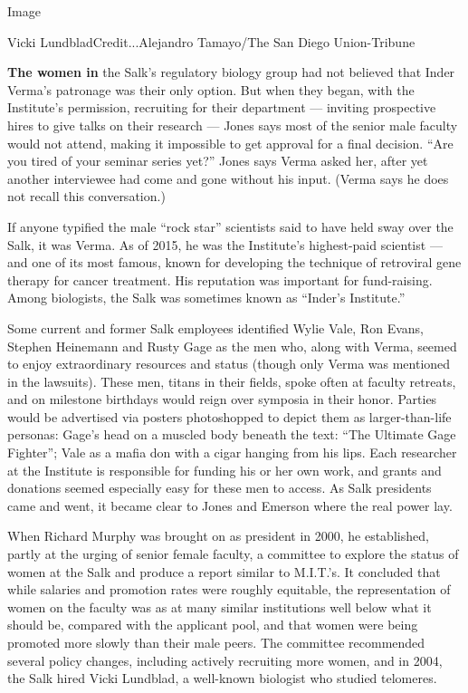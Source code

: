 Image

Vicki LundbladCredit...Alejandro Tamayo/The San Diego Union-Tribune

\textbf{The women in} the Salk's regulatory biology group had not
believed that Inder Verma's patronage was their only option. But when
they began, with the Institute's permission, recruiting for their
department --- inviting prospective hires to give talks on their
research --- Jones says most of the senior male faculty would not
attend, making it impossible to get approval for a final decision. ``Are
you tired of your seminar series yet?'' Jones says Verma asked her,
after yet another interviewee had come and gone without his input.
(Verma says he does not recall this conversation.)

If anyone typified the male ``rock star'' scientists said to have held
sway over the Salk, it was Verma. As of 2015, he was the Institute's
highest-paid scientist --- and one of its most famous, known for
developing the technique of retroviral gene therapy for cancer
treatment. His reputation was important for fund-raising. Among
biologists, the Salk was sometimes known as ``Inder's Institute.''

Some current and former Salk employees identified Wylie Vale, Ron Evans,
Stephen Heinemann and Rusty Gage as the men who, along with Verma,
seemed to enjoy extraordinary resources and status (though only Verma
was mentioned in the lawsuits). These men, titans in their fields, spoke
often at faculty retreats, and on milestone birthdays would reign over
symposia in their honor. Parties would be advertised via posters
photoshopped to depict them as larger-than-life personas: Gage's head on
a muscled body beneath the text: ``The Ultimate Gage Fighter''; Vale as
a mafia don with a cigar hanging from his lips. Each researcher at the
Institute is responsible for funding his or her own work, and grants and
donations seemed especially easy for these men to access. As Salk
presidents came and went, it became clear to Jones and Emerson where the
real power lay.

When Richard Murphy was brought on as president in 2000, he established,
partly at the urging of senior female faculty, a committee to explore
the status of women at the Salk and produce a report similar to
M.I.T.'s. It concluded that while salaries and promotion rates were
roughly equitable, the representation of women on the faculty was as at
many similar institutions well below what it should be, compared with
the applicant pool, and that women were being promoted more slowly than
their male peers. The committee recommended several policy changes,
including actively recruiting more women, and in 2004, the Salk hired
Vicki Lundblad, a well-known biologist who studied telomeres.

